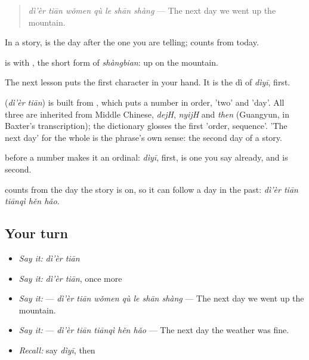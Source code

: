\begin{quote}
\textbf{} \emph{dì'èr tiān wǒmen qù le shān shàng} — The next day we went up the mountain.
\end{quote}

In a story,  is the day after the one you are telling;  counts from today.

 is  with , the short form of \emph{shàngbian}: up on the mountain.

The next lesson puts the first character in your hand. It is the dì of \emph{dìyī}, first.

\begin{cousinweb}
\textbf{} (\emph{dì'èr tiān}) is built from , which puts a number in order,  'two' and  'day'. All three are inherited from Middle Chinese, \emph{dejH}, \emph{nyijH} and \emph{then} (Guangyun, in Baxter's transcription); the dictionary glosses the first 'order, sequence'. 'The next day' for the whole is the phrase's own sense: the second day of a story.
\end{cousinweb}

\begin{grammarlens}[title={What you've built}]
 before a number makes it an ordinal: \emph{dìyī}, first, is one you say already, and  is second.

 counts from the day the story is on, so it can follow a day in the past: \textbf{} \emph{dì'èr tiān tiānqì hěn hǎo}.
\end{grammarlens}

\subsection*{Your turn}
\begin{itemize}
\raggedright
  \item \emph{Say it:} \emph{dì'èr tiān}
  \item \emph{Say it:} \emph{dì'èr tiān}, once more
  \item \emph{Say it:}  — \emph{dì'èr tiān wǒmen qù le shān shàng} — The next day we went up the mountain.
  \item \emph{Say it:}  — \emph{dì'èr tiān tiānqì hěn hǎo} — The next day the weather was fine.
  \item \emph{Recall:} say \emph{dìyī}, then 
\end{itemize}

